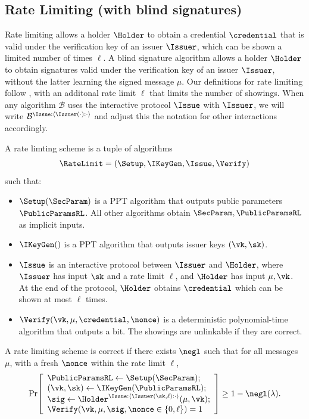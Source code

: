 \subsection{Rate Limiting (with blind signatures)}
Rate limiting allows a holder $\Holder$ to obtain a credential $\credential$ that is valid under the verification key of an issuer $\Issuer$, which can be shown a limited number of times $\ell$.  
A blind signature algorithm allows a holder $\Holder$ to obtain signatures valid under the verification key of an issuer $\Issuer$, without the latter learning the signed message $\mu$. 
Our definitions for rate limiting follow \cite{C:Fischlin06}, with an additonal rate limit $\ell$ that limits the number of showings. 
When any algorithm $\mathcal{B}$ uses the interactive protocol $\Issue$ with $\Issuer$, we will write $\mathcal{B}^{\Issue:\langle \Issuer(\cdot):\cdot \rangle}$ and adjust this the notation for other interactions accordingly.


\begin{definition}\label{def:rate-limit}
  A rate limting scheme is a tuple of algorithms 
 	\[
 	\RateLimit=(\Setup,\IKeyGen,\Issue,\Verify)
 	\]
 	such that:
 	\begin{itemize}[leftmargin=1.25em]
 		\item $\Setup(\SecParam)$ is a PPT algorithm that outputs public parameters $\PublicParamsRL$. All other algorithms obtain $\SecParam,\PublicParamsRL$ as implicit inputs.
 		\item $\IKeyGen()$ is a PPT algorithm that outputs issuer keys $(\vk,\sk)$.
  \item $\Issue$ is an interactive protocol between $\Issuer$ and
    $\Holder$, where $\Issuer$ has input $\sk$ and a rate limit $\ell$, and
    $\Holder$ has input $\mu,\vk$. At the end of the protocol, $\Holder$ obtains
    $\credential$ which can be shown at most $\ell$ times.
 		\item $\Verify(\vk,\mu,\credential,\nonce)$ is a deterministic polynomial-time algorithm that outputs a bit.
  The showings are unlinkable if they are correct. 
 	\end{itemize}
\end{definition}

\begin{definition}[Correctness]\label{def:rate-limit-correctness}
	A rate limiting scheme is correct if there exists \(\negl\) such that for all messages \(\mu\), with a fresh \(\nonce\) within the rate limit $\ell$,
 	\[
 	\Pr\!\left[
 	\begin{array}{l}
 		\PublicParamsRL \gets \Setup(\SecParam); \\
 		(\vk,\sk)\gets \IKeyGen(\PublicParamsRL);\\
 		\sig\gets \Holder^{\Issue: \langle \Issuer(\sk,\ell): \cdot  \rangle }(\mu,\vk);\\
    \Verify(\vk,\mu,\sig,\nonce \in \{0,\ell\})=1
 	\end{array}
 	\right]
 	\ge 1-\negl(\lambda).
 	\]
\end{definition}

